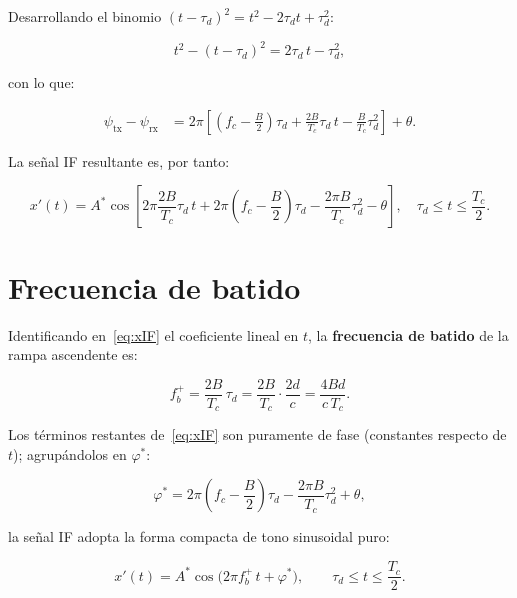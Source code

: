 \documentclass[12pt, a4paper, twoside]{report}
\begin{document}
Desarrollando el binomio $(t-\tau_d)^2 = t^2 - 2\tau_d t + \tau_d^2$:

\begin{equation}
  t^2 - (t-\tau_d)^2 = 2\tau_d\,t - \tau_d^2,
\end{equation}

con lo que:

\begin{align}
  \psi_\text{tx} - \psi_\text{rx}
  &= 2\pi\left[\left(f_c-\frac{B}{2}\right)\tau_d
    + \frac{2B}{T_c}\tau_d\,t
  - \frac{B}{T_c}\tau_d^2\right] + \theta.
  \label{eq:diff_phase}
\end{align}

La señal IF resultante es, por tanto:

\begin{equation}
  x'(t) = A^*\cos\!\left[
    2\pi\frac{2B}{T_c}\tau_d\,t
    + 2\pi\!\left(f_c-\frac{B}{2}\right)\!\tau_d
    - \frac{2\pi B}{T_c}\tau_d^2 - \theta
  \right],
  \quad \tau_d \leq t \leq \frac{T_c}{2}.
  \label{eq:xIF}
\end{equation}

\section{Frecuencia de batido}
\label{sec:beat_freq}

Identificando en~\eqref{eq:xIF} el coeficiente lineal en $t$,
la \textbf{frecuencia de batido} de la rampa ascendente es:

\begin{equation}
  f_b^+ = \frac{2B}{T_c}\,\tau_d = \frac{2B}{T_c}\cdot\frac{2d}{c}
  = \frac{4Bd}{c\,T_c}.
  \label{eq:fb_up}
\end{equation}

Los términos restantes de~\eqref{eq:xIF} son puramente de fase
(constantes respecto de $t$); agrupándolos en $\varphi^*$:

\begin{equation}
  \varphi^* = 2\pi\!\left(f_c - \frac{B}{2}\right)\!\tau_d
  - \frac{2\pi B}{T_c}\tau_d^2 + \theta,
\end{equation}

la señal IF adopta la forma compacta de tono sinusoidal puro:

\begin{equation}
  \boxed{
    x'(t) = A^*\cos\!\bigl(2\pi f_b^+\, t + \varphi^*\bigr),
    \qquad \tau_d \leq t \leq \frac{T_c}{2}.
  }
  \label{eq:xIF_compact}
\end{equation}
\end{document}

